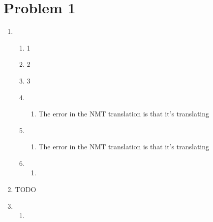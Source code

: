 \documentclass[12pt]{article}
\begin{document}
\section*{Problem 1}
\begin{enumerate}[label=(\alph*)]
  \item 
    \begin{enumerate}[label=\roman*]
      \item 1
      \item 2
      \item 3
      \item
         \begin{enumerate}[label=\arabic*]
          \item The error in the NMT translation is that it's translating 
        \end{enumerate}
      \item
        \begin{enumerate}[label=\arabic*]
          \item The error in the NMT translation is that it's translating 
        \end{enumerate}
      \item 
        \begin{enumerate}[label=\arabic*]
          \item 
        \end{enumerate}
    \end{enumerate}
  \item TODO
  \item 
    \begin{enumerate}[label=\roman*]
      \item
    \end{enumerate}
\end{enumerate}
\end{document}
